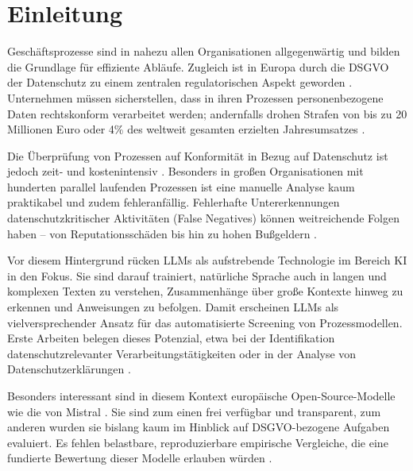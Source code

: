 \chapter{Einleitung}\label{ch:einleitung}

Geschäftsprozesse sind in nahezu allen Organisationen allgegenwärtig und bilden die Grundlage für effiziente Abläufe. Zugleich ist in Europa durch die \ac{DSGVO} der Datenschutz zu einem zentralen regulatorischen Aspekt geworden \cite{Capodieci2023BPMNEnabledDP, GDPR2016}. Unternehmen müssen sicherstellen, dass in ihren Prozessen personenbezogene Daten rechtskonform verarbeitet werden; andernfalls drohen Strafen von bis zu 20 Millionen Euro oder 4\% des weltweit gesamten erzielten Jahresumsatzes \cite{GDPR2016}.


Die Überprüfung von Prozessen auf Konformität in Bezug auf Datenschutz ist jedoch zeit- und kostenintensiv \cite{nake2023towards, varela2025business}. Besonders in großen Organisationen mit hunderten parallel laufenden Prozessen ist eine manuelle Analyse kaum praktikabel und zudem fehleranfällig. Fehlerhafte Untererkennungen datenschutzkritischer Aktivitäten (False Negatives) können weitreichende Folgen haben – von Reputationsschäden bis hin zu hohen Bußgeldern \cite{nake2023towards}.


Vor diesem Hintergrund rücken \acp{LLM} als aufstrebende Technologie im Bereich \ac{KI} in den Fokus. Sie sind darauf trainiert, natürliche Sprache auch in langen und komplexen Texten zu verstehen, Zusammenhänge über große Kontexte hinweg zu erkennen und Anweisungen zu befolgen. Damit erscheinen \acp{LLM} als vielversprechender Ansatz für das automatisierte Screening von Prozessmodellen. Erste Arbeiten belegen dieses Potenzial, etwa bei der Identifikation datenschutzrelevanter Verarbeitungstätigkeiten oder in der Analyse von Datenschutzerklärungen \cite{ciaramella2022leveraging, pragyan2024toward}.


Besonders interessant sind in diesem Kontext europäische Open-Source-Modelle wie die von Mistral \cite{mistralai}. Sie sind zum einen frei verfügbar und transparent, zum anderen wurden sie bislang kaum im Hinblick auf \ac{DSGVO}-bezogene Aufgaben evaluiert. Es fehlen belastbare, reproduzierbare empirische Vergleiche, die eine fundierte Bewertung dieser Modelle erlauben würden \cite{schwerin2024systematic}.



